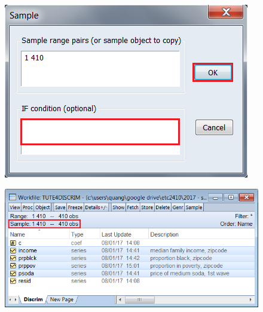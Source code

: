 \documentclass[12pt]{report}
\begin{document}
\vspace{-\baselineskip}
\begin{figure}[H]
	\centerline{\includegraphics{tute5_7}}
\end{figure}
\vspace{-\baselineskip}
\begin{figure}[H]
	\centerline{\includegraphics{tute5_8}}
\end{figure}
\vspace{-\baselineskip}
\end{document}
